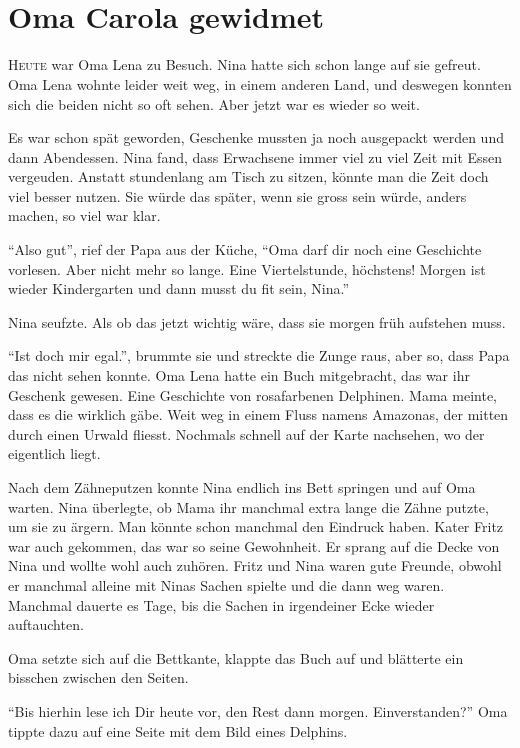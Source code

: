 \chapter*{{}\\\small \color{red} Oma Carola gewidmet}
\lettrine[lines=3]{\color{red}H}{eute} war Oma Lena zu Besuch. Nina hatte sich schon lange auf sie gefreut. Oma Lena wohnte leider weit weg, in einem anderen Land, und deswegen konnten sich die beiden nicht so oft sehen. Aber jetzt war es wieder so weit. 

Es war schon spät geworden, Geschenke mussten ja noch ausgepackt werden und dann Abendessen. Nina fand, dass Erwachsene immer viel zu viel Zeit mit Essen vergeuden. Anstatt stundenlang am Tisch zu sitzen, könnte man die Zeit doch viel besser nutzen. Sie würde das später, wenn sie gross sein würde, anders machen, so viel war klar.

\enquote{Also gut}, rief der Papa aus der Küche, \enquote{Oma darf dir noch eine Geschichte vorlesen. Aber nicht mehr so lange. Eine Viertelstunde, höchstens! Morgen ist wieder Kindergarten und dann musst du fit sein, Nina.}

Nina seufzte. Als ob das jetzt wichtig wäre, dass sie morgen früh aufstehen muss. 

\enquote{Ist doch mir egal.}, brummte sie und streckte die Zunge raus, aber so, dass Papa das nicht sehen konnte. Oma Lena hatte ein Buch mitgebracht, das war ihr Geschenk gewesen. Eine Geschichte von rosafarbenen Delphinen. Mama meinte, dass es die wirklich gäbe. Weit weg in einem Fluss namens Amazonas, der mitten durch einen Urwald fliesst. Nochmals schnell auf der Karte nachsehen, wo der eigentlich liegt.

Nach dem Zähneputzen konnte Nina endlich ins Bett springen und auf Oma warten. Nina überlegte, ob Mama ihr manchmal extra lange die Zähne putzte, um sie zu ärgern. Man könnte schon manchmal den Eindruck haben. Kater Fritz war auch gekommen, das war so seine Gewohnheit. Er sprang auf die Decke von Nina und wollte wohl auch zuhören. Fritz und Nina waren gute Freunde, obwohl er manchmal alleine mit Ninas Sachen spielte und die dann weg waren. Manchmal dauerte es Tage, bis die Sachen in irgendeiner Ecke wieder auftauchten. 

Oma setzte sich auf die Bettkante, klappte das Buch auf und blätterte ein bisschen zwischen den Seiten.

\enquote{Bis hierhin lese ich Dir heute vor, den Rest dann morgen. Einverstanden?} Oma tippte dazu auf eine Seite mit dem Bild eines Delphins. 

